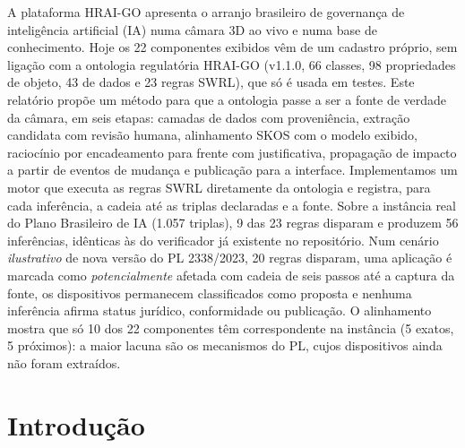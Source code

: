 \documentclass[12pt,a4paper,oneside,english,brazil]{abntex2}
\begin{document}

\pretextual
\imprimirfolhaderostorelatorio

\begin{resumorelatorio}
A plataforma HRAI-GO apresenta o arranjo brasileiro de governança de inteligência artificial (IA) numa câmara 3D ao vivo e numa base de conhecimento. Hoje os 22 componentes exibidos vêm de um cadastro próprio, sem ligação com a ontologia regulatória HRAI-GO (v1.1.0, 66 classes, 98 propriedades de objeto, 43 de dados e 23 regras SWRL), que só é usada em testes. Este relatório propõe um método para que a ontologia passe a ser a fonte de verdade da câmara, em seis etapas: camadas de dados com proveniência, extração candidata com revisão humana, alinhamento SKOS com o modelo exibido, raciocínio por encadeamento para frente com justificativa, propagação de impacto a partir de eventos de mudança e publicação para a interface. Implementamos um motor que executa as regras SWRL diretamente da ontologia e registra, para cada inferência, a cadeia até as triplas declaradas e a fonte. Sobre a instância real do Plano Brasileiro de IA (1.057 triplas), 9 das 23 regras disparam e produzem 56 inferências, idênticas às do verificador já existente no repositório. Num cenário \emph{ilustrativo} de nova versão do PL 2338/2023, 20 regras disparam, uma aplicação é marcada como \emph{potencialmente} afetada com cadeia de seis passos até a captura da fonte, os dispositivos permanecem classificados como proposta e nenhuma inferência afirma status jurídico, conformidade ou publicação. O alinhamento mostra que só 10 dos 22 componentes têm correspondente na instância (5 exatos, 5 próximos): a maior lacuna são os mecanismos do PL, cujos dispositivos ainda não foram extraídos.
\end{resumorelatorio}


\tableofcontents*
\cleardoublepage

\textual

\chapter{Introdução}\label{cap:intro}
\end{document}
